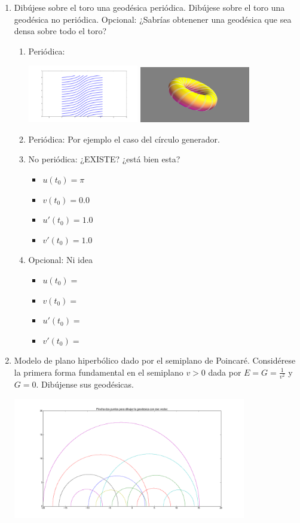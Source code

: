 \documentclass[12pt,a4paper]{article}
\begin{document}
\begin{enumerate}
\item Dibújese sobre el toro una geodésica periódica. Dibújese sobre
  el toro una geodésica no periódica. Opcional: ¿Sabrías obtenener una
  geodésica que sea densa sobre todo el toro?
  \begin{enumerate}
  \item Periódica: 
  \begin{center}
    \includegraphics[width=0.4\textwidth]{./img/periodica_trace.png}
    \includegraphics[width=0.4\textwidth]{./img/periodica_surface.png}
  \end{center}
  \item Periódica: Por ejemplo el caso del círculo generador.
  \item No periódica: ¿EXISTE? ¿está bien esta?
    \begin{itemize}
    \item $u(t_0) = \pi$
    \item $v(t_0) = 0.0$
    \item $u'(t_0) = 1.0$
    \item $v'(t_0) = 1.0$
    \end{itemize}
  \item Opcional: Ni idea
    \begin{itemize}
    \item $u(t_0) = $
    \item $v(t_0) = $
    \item $u'(t_0) = $
    \item $v'(t_0) = $
    \end{itemize}
  \end{enumerate}
\item Modelo de plano hiperbólico dado por el semiplano de
  Poincaré. Considérese la primera forma fundamental en el semiplano
  $v>0$ dada por $E = G = \frac{1}{v^{2}}$ y $G = 0$. Dibújense sus
  geodésicas. 
  \begin{center}
    \includegraphics[width=0.8\textwidth]{./img/poincare.png}
  \end{center}

\end{enumerate}
\end{document}
